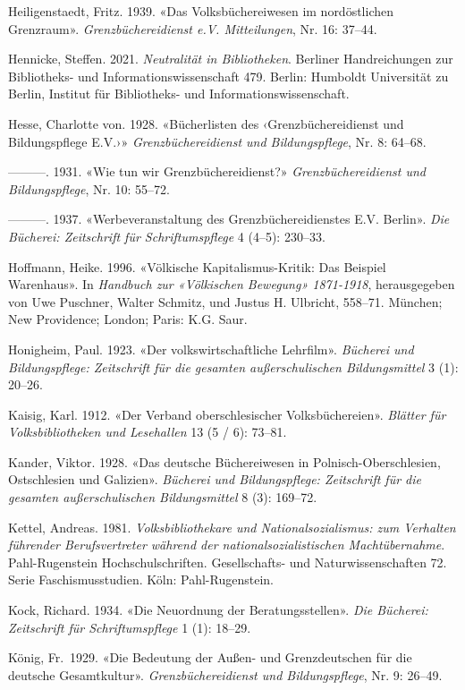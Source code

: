 \documentclass[a4paper,
fontsize=11pt,
oneside,
numbers=noperiodatend,
parskip=half-,
bibliography=totoc,
final
]{scrartcl}
\begin{document}
Heiligenstaedt, Fritz. 1939. «Das Volksbüchereiwesen im nordöstlichen
Grenzraum». \emph{Grenzbüchereidienst e.V. Mitteilungen}, Nr. 16:
37--44.

Hennicke, Steffen. 2021. \emph{Neutralität in Bibliotheken}. Berliner
Handreichungen zur Bibliotheks- und Informationswissenschaft 479.
Berlin: Humboldt Universität zu Berlin, Institut für Bibliotheks- und
Informationswissenschaft.

Hesse, Charlotte von. 1928. «Bücherlisten des ‹Grenzbüchereidienst und
Bildungspflege E.V.›» \emph{Grenzbüchereidienst und Bildungspflege}, Nr.
8: 64--68.

---------. 1931. «Wie tun wir Grenzbüchereidienst?»
\emph{Grenzbüchereidienst und Bildungspflege}, Nr. 10: 55--72.

---------. 1937. «Werbeveranstaltung des Grenzbüchereidienstes E.V.
Berlin». \emph{Die Bücherei: Zeitschrift für Schriftumspflege} 4 (4--5):
230--33.

Hoffmann, Heike. 1996. «Völkische Kapitalismus-Kritik: Das Beispiel
Warenhaus». In \emph{Handbuch zur «Völkischen Bewegung» 1871-1918},
herausgegeben von Uwe Puschner, Walter Schmitz, und Justus H. Ulbricht,
558--71. München; New Providence; London; Paris: K.G. Saur.

Honigheim, Paul. 1923. «Der volkswirtschaftliche Lehrfilm».
\emph{Bücherei und Bildungspflege: Zeitschrift für die gesamten
außerschulischen Bildungsmittel} 3 (1): 20--26.

Kaisig, Karl. 1912. «Der Verband oberschlesischer Volksbüchereien».
\emph{Blätter für Volksbibliotheken und Lesehallen} 13 (5 / 6): 73--81.

Kander, Viktor. 1928. «Das deutsche Büchereiwesen in
Polnisch-Oberschlesien, Ostschlesien und Galizien». \emph{Bücherei und
Bildungspflege: Zeitschrift für die gesamten außerschulischen
Bildungsmittel} 8 (3): 169--72.

Kettel, Andreas. 1981. \emph{Volksbibliothekare und Nationalsozialismus:
zum Verhalten führender Berufsvertreter während der
nationalsozialistischen Machtübernahme}. Pahl-Rugenstein
Hochschulschriften. Gesellschafts- und Naturwissenschaften 72. Serie
Faschismusstudien. Köln: Pahl-Rugenstein.

Kock, Richard. 1934. «Die Neuordnung der Beratungsstellen». \emph{Die
Bücherei: Zeitschrift für Schriftumspflege} 1 (1): 18--29.

König, Fr.~1929. «Die Bedeutung der Außen- und Grenzdeutschen für die
deutsche Gesamtkultur». \emph{Grenzbüchereidienst und Bildungspflege},
Nr. 9: 26--49.
\end{document}
